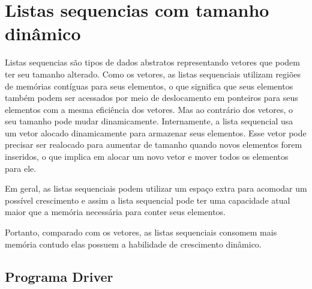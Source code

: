 
\chapter{Listas sequencias com tamanho dinâmico}

Listas sequencias são tipos de dados abstratos representando vetores que podem ter seu tamanho alterado. Como os vetores, as listas sequenciais utilizam regiões de memórias contíguas para seus elementos, o que significa que seus elementos também podem ser acessados por meio de deslocamento em ponteiros para seus elementos com a mesma eficiência dos vetores. Mas ao contrário dos vetores, o seu tamanho pode mudar dinamicamente. Internamente, a lista sequencial usa um vetor alocado dinamicamente para armazenar seus elementos. Esse vetor pode precisar ser realocado para aumentar de tamanho quando novos elementos forem inseridos, o que implica em alocar um novo vetor e mover todos os elementos para ele.

Em geral, as listas sequenciais podem utilizar um espaço extra para acomodar um possível crescimento e assim a lista sequencial pode ter uma capacidade atual maior que a memória necessária para conter seus elementos.

Portanto, comparado com os vetores, as listas sequenciais consomem mais memória contudo elas possuem a habilidade de crescimento dinâmico.

\section{Programa Driver}

